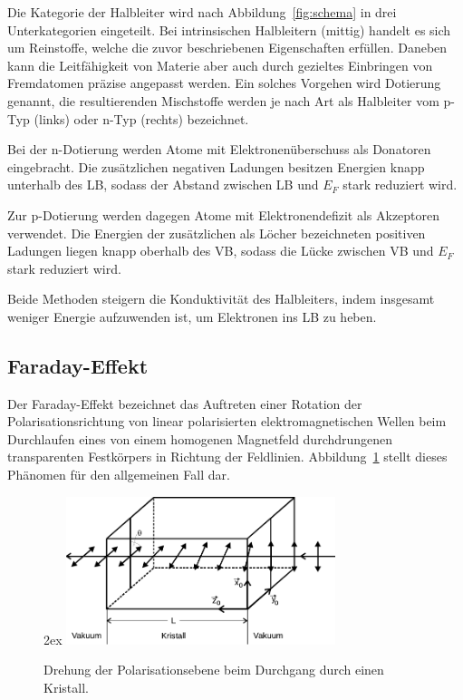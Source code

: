 Die Kategorie der Halbleiter wird nach Abbildung~\ref{fig:schema} in drei Unterkategorien eingeteilt. Bei intrinsischen
Halbleitern (mittig) handelt es sich um Reinstoffe, welche die zuvor beschriebenen Eigenschaften erfüllen. Daneben kann
die Leitfähigkeit von Materie aber auch durch gezieltes Einbringen von Fremdatomen präzise angepasst werden. Ein solches
Vorgehen wird Dotierung genannt, die resultierenden Mischstoffe werden je nach Art als Halbleiter vom p\hspace{0.25ex}-Typ
(links) oder n\hspace{0.15ex}-Typ (rechts) bezeichnet. 

Bei der n\hspace{0.15ex}-Dotierung werden Atome mit Elektronenüberschuss als Donatoren eingebracht. Die zusätzlichen
negativen Ladungen besitzen Energien knapp unterhalb des LB, sodass der Abstand zwischen LB und $E_F$ stark reduziert
wird.

Zur p\hspace{0.25ex}-Dotierung werden dagegen Atome mit Elektronendefizit als Akzeptoren verwendet. Die Energien
der zusätzlichen als Löcher bezeichneten positiven Ladungen liegen knapp oberhalb des VB, sodass die Lücke zwischen VB und
$E_F$ stark reduziert wird.

Beide Methoden steigern die Konduktivität des Halbleiters, indem insgesamt weniger Energie aufzuwenden ist, um Elektronen
ins LB zu heben. 

\subsection{Faraday-Effekt}

Der Faraday-Effekt bezeichnet das Auftreten einer Rotation der Polarisationsrichtung von linear polarisierten elektromagnetischen
Wellen beim Durchlaufen eines von einem homogenen Magnetfeld durchdrungenen transparenten Festkörpers in Richtung der Feldlinien.
Abbildung~\ref{fig:drehung} stellt dieses Phänomen für den allgemeinen Fall dar.

\begin{figure}[H]
    \vfill{2ex}
    \centering
    \includegraphics[width=0.7\textwidth]{content/grafik/drehung.pdf}
    \captionsetup{width=.95\linewidth}
    \caption{Drehung der Polarisationsebene beim Durchgang durch einen Kristall. \cite{faraday}}
    \label{fig:drehung}
\end{figure}


